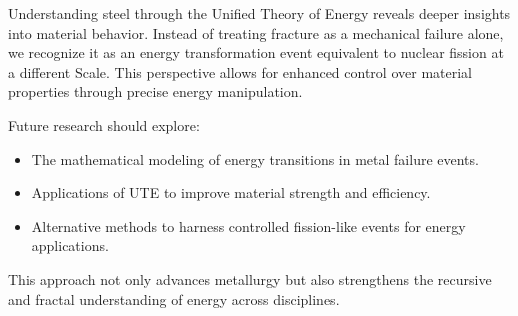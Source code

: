 \documentclass[letterpaper,12pt]{article}
\begin{document}
Understanding steel through the Unified Theory of Energy reveals deeper insights into material behavior. Instead of treating fracture as a mechanical failure alone, we recognize it as an energy transformation event equivalent to nuclear fission at a different Scale. This perspective allows for enhanced control over material properties through precise energy manipulation.

Future research should explore:
\begin{itemize}
    \item The mathematical modeling of energy transitions in metal failure events.
    \item Applications of UTE to improve material strength and efficiency.
    \item Alternative methods to harness controlled fission-like events for energy applications.
\end{itemize}

This approach not only advances metallurgy but also strengthens the recursive and fractal understanding of energy across disciplines.
\end{document}
